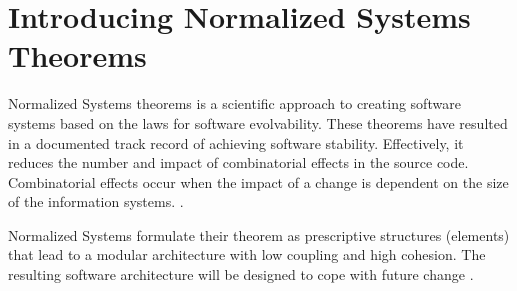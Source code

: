 \section{Introducing Normalized Systems Theorems}

Normalized Systems theorems is a scientific approach to creating software systems based on
the laws for software evolvability. These theorems have resulted in a documented track
record of achieving software stability. Effectively, it reduces the number and impact of
combinatorial effects in the source code. Combinatorial effects occur when the impact of a
change is dependent on the size of the information systems.
\parencite[]{mannaert_normalized_2009}. 

Normalized Systems formulate their theorem as prescriptive structures (elements) that 
lead to a modular architecture with low coupling and high cohesion. The resulting software
architecture will be designed to cope with future change
\parencites[]{mannaert_normalized_2009}.         